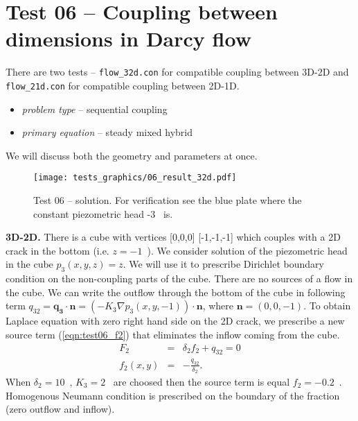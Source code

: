 
\section{Test 06 -- Coupling between dimensions in Darcy flow}
\label{sec:test06}
There are two tests -- \verb'flow_32d.con' for compatible coupling between 3D-2D and \verb'flow_21d.con' for compatible coupling between 2D-1D.

\begin{itemize} 
    \item \emph{problem type} -- sequential coupling 
    \item \emph{primary equation} -- steady mixed hybrid
  \end{itemize}

We will discuss both the geometry and parameters at once.

%
\begin{figure}[h!]
\centering
\texttt{[image: tests\_graphics/06\_result\_32d.pdf]}
\caption{Test 06 -- solution. For verification see the blue plate where the constant 
         piezometric head -3~ is.}
\label{fig:test6_solution_32d}
\end{figure}
%
\textbf{3D-2D.}
There is a cube with vertices [0,0,0] [-1,-1,-1] which couples with a 2D crack in the bottom (i.e. $z=-1$~).
We consider solution of the piezometric head in the cube $p_3(x,y,z) = z$. We will use it to 
prescribe Dirichlet boundary condition on the non-coupling parts of the cube.
There are no sources of a flow in the cube. 
We can write the outflow through the bottom of the cube in following term 
$q_{32} = \mathbf{q_3} \cdot \mathbf{n} = (- K_3 \nabla p_3(x,y,-1))\cdot \mathbf{n}$,
where $\mathbf{n}=(0,0,-1)$.
To obtain Laplace equation with zero right hand side on the 2D crack, we prescribe a new source 
term (\ref{eqn:test06_f2}) that eliminates the inflow coming from the cube.         
\begin{eqnarray}
    F_2 &=& \delta_2  f_2 + q_{32} = 0   \nonumber\\
    f_2(x,y) &=& -\frac{q_{32}}{\delta_2}   \label{eqn:test06_f2}.
\end{eqnarray}
When $\delta_2 = 10$~, $K_3 = 2$~ are choosed then the source term is equal $f_2 = -0.2$~.
Homogenous Neumann condition is prescribed on the boundary of the fraction (zero outflow and inflow).

